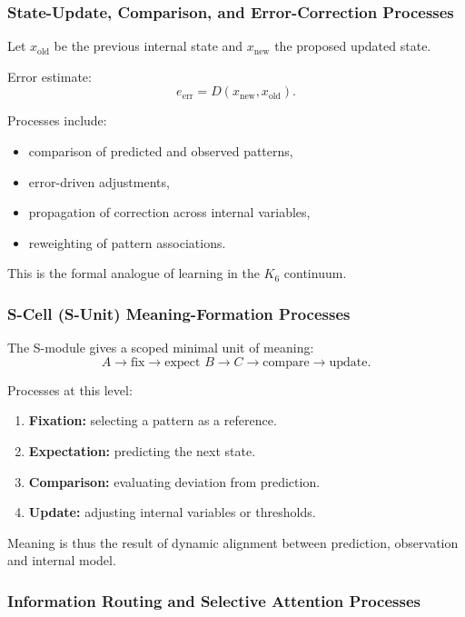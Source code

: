 \subsubsection{State-Update, Comparison, and Error-Correction Processes}

Let $x_{\text{old}}$ be the previous internal state and
$x_{\text{new}}$ the proposed updated state.

Error estimate:
\[
e_{\mathrm{err}} = D(x_{\text{new}}, x_{\text{old}}).
\]

Processes include:
\begin{itemize}
    \item comparison of predicted and observed patterns,
    \item error-driven adjustments,
    \item propagation of correction across internal variables,
    \item reweighting of pattern associations.
\end{itemize}

This is the formal analogue of learning in the $K_6$ continuum.

\subsubsection{S-Cell (S-Unit) Meaning-Formation Processes}

The S-module gives a scoped minimal unit of meaning:
\[
A \to \text{fix} \to \text{expect } B \to C \to \text{compare} \to
\text{update}.
\]

Processes at this level:
\begin{enumerate}
    \item \textbf{Fixation:}
    selecting a pattern as a reference.
    \item \textbf{Expectation:}
    predicting the next state.
    \item \textbf{Comparison:}
    evaluating deviation from prediction.
    \item \textbf{Update:}
    adjusting internal variables or thresholds.
\end{enumerate}

Meaning is thus the result of dynamic alignment between prediction,
observation and internal model.

\subsubsection{Information Routing and Selective Attention Processes}

